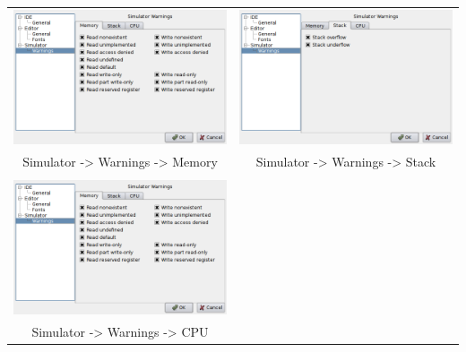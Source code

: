         \begin{table}[h!]
            \begin{tabular}{cc}
                \includegraphics[width=.45\textwidth]{img/interface4.png}
                    &
                \includegraphics[width=.45\textwidth]{img/interface5.png}
                \\ Simulator -> Warnings -> Memory & Simulator -> Warnings -> Stack
                \\
                \\ \includegraphics[width=.5\textwidth]{img/interface4.png}
                \\ Simulator -> Warnings -> CPU
            \end{tabular}
        \end{table}


